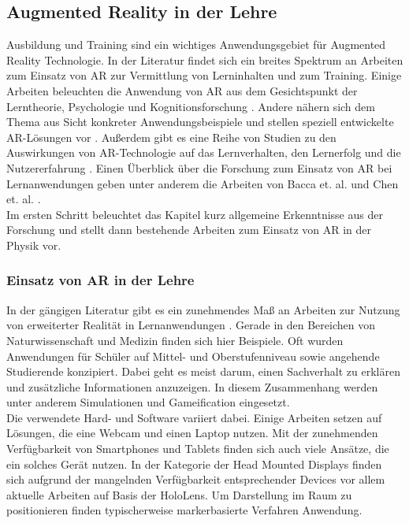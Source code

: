 \subsection{Augmented Reality in der Lehre}
\label{sec-2-2}
Ausbildung und Training sind ein wichtiges Anwendungsgebiet für Augmented Reality Technologie. In der Literatur findet sich ein breites Spektrum an Arbeiten zum Einsatz von AR zur Vermittlung von Lerninhalten und zum Training. Einige Arbeiten beleuchten die Anwendung von AR aus dem Gesichtspunkt der Lerntheorie, Psychologie und Kognitionsforschung \cite{Marichal17, Santos14}. Andere nähern sich dem Thema aus Sicht konkreter Anwendungsbeispiele und stellen speziell entwickelte AR-Lösungen vor \cite{Strzys17, Amiraslanov18, Buchau09, Hughes05}. Außerdem gibt es eine Reihe von Studien zu den Auswirkungen von AR-Technologie auf das Lernverhalten, den Lernerfolg und die Nutzererfahrung \cite{Ibanez14, Li11, Jerry10, Akcayir16, Strzys18}. Einen Überblick über die Forschung zum Einsatz von AR bei Lernanwendungen geben unter anderem die Arbeiten von Bacca et. al. und Chen et. al. \cite{Chen2017, Bacca14}.\\

Im ersten Schritt beleuchtet das Kapitel kurz allgemeine Erkenntnisse aus der Forschung und stellt dann bestehende Arbeiten zum Einsatz von AR in der Physik vor.

\subsubsection{Einsatz von AR in der Lehre}
\label{sec-2-2-1}
In der gängigen Literatur gibt es ein zunehmendes Maß an Arbeiten zur Nutzung von erweiterter Realität in Lernanwendungen \cite{Bacca14, Ibanez18}. Gerade in den Bereichen von Naturwissenschaft und Medizin finden sich hier Beispiele. Oft wurden Anwendungen für Schüler auf Mittel- und Oberstufenniveau sowie angehende Studierende konzipiert. Dabei geht es meist darum, einen Sachverhalt zu erklären und zusätzliche Informationen anzuzeigen. In diesem Zusammenhang werden unter anderem Simulationen und Gameification eingesetzt.\\

Die verwendete Hard- und Software variiert dabei. Einige Arbeiten setzen auf Lösungen, die eine Webcam und einen Laptop nutzen. Mit der zunehmenden Verfügbarkeit von Smartphones und Tablets finden sich auch viele Ansätze, die ein solches Gerät nutzen. In der Kategorie der Head Mounted Displays finden sich aufgrund der mangelnden Verfügbarkeit entsprechender Devices vor allem aktuelle Arbeiten auf Basis der HoloLens. Um Darstellung im Raum zu positionieren finden typischerweise markerbasierte Verfahren Anwendung.\\


